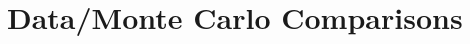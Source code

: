 \documentclass[../main.tex]{subfiles}
\begin{document}
\section{Data/Monte Carlo Comparisons}
\label{sec:dataMC}
\end{document}
